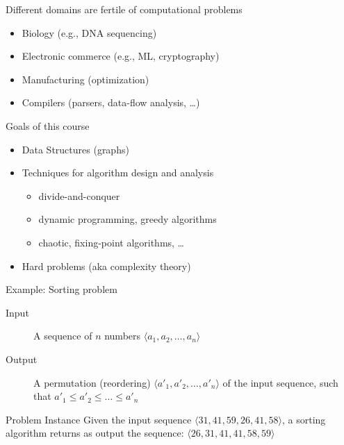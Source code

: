 \begin{frame}{Different domains are fertile of computational problems}

  \begin{itemize}
   \item Biology (e.g., DNA sequencing)
   \item Electronic commerce (e.g., ML, cryptography)
   \item Manufacturing (optimization)
   \item Compilers (parsers, data-flow analysis, \ldots)
  \end{itemize}
  
\end{frame}

\begin{frame}{Goals of this course}
  \begin{itemize}
   \item Data Structures (graphs)
   \item Techniques for {\color{blue}algorithm design and analysis}
     \begin{itemize}
       \item divide-and-conquer
       \item dynamic programming, greedy algorithms
       \item chaotic, fixing-point algorithms, \ldots  
     \end{itemize}
   \item Hard problems (aka {\color{blue}complexity} theory) 
  \end{itemize}
\end{frame}


\begin{frame}{Example: Sorting problem}

  \begin{description}
   \item[Input] A sequence of $n$ numbers $\langle a_1, a_2, \ldots, a_n \rangle$
   \item[Output] A permutation (reordering) $\langle a'_1, a'_2, \ldots, a'_n \rangle$ of the input
     sequence, such that $a'_1 \leq a'_2 \leq \ldots \leq a'_n$
  \end{description}

  \pause
  
  \begin{block}{Problem Instance}
    Given the input sequence $\langle 31, 41, 59, 26, 41, 58\rangle$,
    a sorting algorithm returns as output the sequence: \pause
    $\langle 26, 31, 41, 41, 58, 59 \rangle$
  \end{block}


\end{frame}

